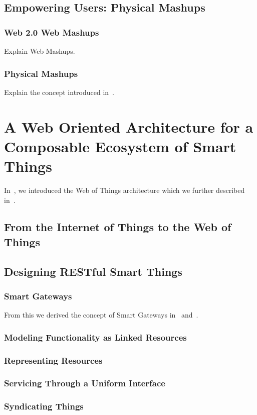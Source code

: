\documentclass[a4paper,10pt]{report}
\begin{document}
  \section{Empowering Users: Physical Mashups}
    \subsection{Web 2.0 Web Mashups}
    Explain Web Mashups.
    \subsection{Physical Mashups}
    Explain the concept introduced in~\cite{guinard_resource_2010}.

\chapter{A Web Oriented Architecture for a Composable Ecosystem of Smart Things}
  In~\cite{Guinard09b}, we introduced the Web of Things architecture which we further described in~\cite{guinard_resource_2010}.

    \section{From the Internet of Things to the Web of Things}
    \section{Designing RESTful Smart Things}
      \subsection{Smart Gateways}
      From this we derived the concept of Smart Gateways in~\cite{guinard_tsc} and~\cite{trifa_design_2009}.
      \subsection{Modeling Functionality as Linked Resources}
      \subsection{Representing Resources}
      \subsection{Servicing Through a Uniform Interface}
      \subsection{Syndicating Things}
\end{document}
